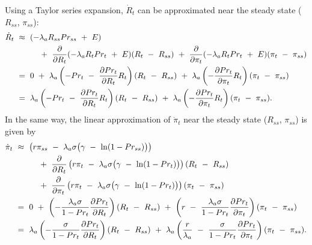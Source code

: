 Using a Taylor series expansion, $\dot{R}_{t}$ can be approximated near the steady state ($R_{ss}$, $\pi_{ss}$):
\begin{equation*}
\begin{split}
    \dot{R}_{t} \ 
    & \approx \ (-\lambda_{a} R_{ss} Pr_{ss} \ + \ E) \\
    & \hspace{1.0cm} + \ \frac{\partial}{\partial R_{t}} (-\lambda_{a} R_{t} Pr_{t} \ + \ E) (R_{t} \ - \ R_{ss}) \ + \ \frac{\partial}{\partial \pi_{t}} (-\lambda_{a} R_{t} Pr_{t} \ + \ E) (\pi_{t} \ - \ \pi_{ss}) \\
    & = \ 0 \ + \ \lambda_{a} \left( -Pr_{t} \ - \ \frac{\partial Pr_{t}}{\partial R_{t}} R_{t} \right) (R_{t} \ - \ R_{ss}) \ + \ \lambda_{a} \left( -\frac{\partial Pr_{t}}{\partial \pi_{t}} R_{t} \right) (\pi_{t} \ - \ \pi_{ss}) \\
    & = \ \lambda_{a} \left( -Pr_{t} \ - \ \frac{\partial Pr_{t}}{\partial R_{t}} R_{t} \right) (R_{t} \ - \ R_{ss}) \ + \ \lambda_{a} \left( -\frac{\partial Pr_{t}}{\partial \pi_{t}} R_{t} \right) (\pi_{t} \ - \ \pi_{ss}).
\end{split}
\end{equation*}
In the same way, the linear approximation of $\dot{\pi}_{t}$ near the steady state ($R_{ss}$, $\pi_{ss}$) is given by
\begin{equation*}
\begin{split}
    \dot{\pi}_{t} \ 
    & \approx \ \left(r \pi_{ss} \ - \ \lambda_{a} \sigma \big( \gamma \ - \ \ln(1 - Pr_{ss}) \big) \right) \\
    & \hspace{1.0cm} + \ \frac{\partial}{\partial R_{t}} \left(r \pi_{t} \ - \ \lambda_{a} \sigma \big( \gamma \ - \ \ln(1 - Pr_{t}) \big) \right) (R_{t} \ - \ R_{ss}) \\
    & \hspace{1.0cm} + \ \frac{\partial}{\partial \pi_{t}} \left(r \pi_{t} \ - \ \lambda_{a} \sigma \big( \gamma \ - \ \ln(1 - Pr_{t}) \big) \right) (\pi_{t} \ - \ \pi_{ss}) \\
    & = \ 0 \ + \ \left( -\frac{\lambda_{a} \sigma}{1 - Pr_{t}} \frac{\partial Pr_{t}}{\partial R_{t}} \right) (R_{t} \ - \ R_{ss}) \ + \ \left( r \ - \ \frac{\lambda_{a} \sigma}{1 - Pr_{t}} \frac{\partial Pr_{t}}{\partial \pi_{t}} \right) (\pi_{t} \ - \ \pi_{ss}) \\
    & = \ \lambda_{a} \left( -\frac{\sigma}{1 - Pr_{t}} \frac{\partial Pr_{t}}{\partial R_{t}} \right) (R_{t} \ - \ R_{ss}) \ + \ \lambda_{a} \left( \frac{r}{\lambda_{a}} \ - \ \frac{\sigma}{1 - Pr_{t}} \frac{\partial Pr_{t}}{\partial \pi_{t}} \right) (\pi_{t} \ - \ \pi_{ss}).
\end{split}
\end{equation*}
